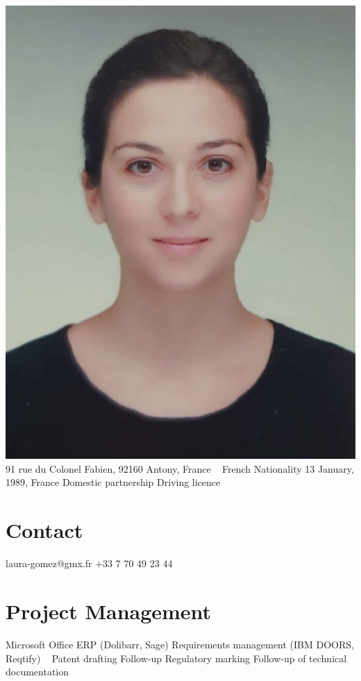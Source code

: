 \documentclass{cv-style}     %
\begin{document}


\begin{aside}
    \includegraphics[width=.8\columnwidth]{img/LG}
    91 rue du Colonel Fabien, 92160 Antony, France
    ~
    French Nationality
    13 January, 1989, France
    Domestic partnership
    Driving licence
    \section{Contact}
    laura-gomez@gmx.fr
    +33 7 70 49 23 44    
    \section{Project Management}
    Microsoft Office
    ERP (Dolibarr, Sage)
    Requirements management (IBM DOORS, Reqtify)
    ~
    Patent drafting
    Follow-up Regulatory marking
    Follow-up of technical documentation

\end{aside}
\end{document}
